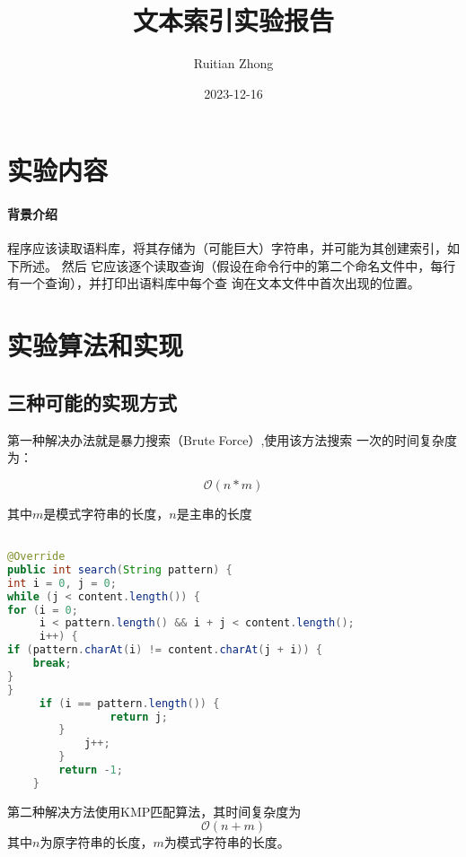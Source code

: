 \documentclass[12pt,a4paper]{ctexart}
\title{文本索引实验报告}
\author{Ruitian Zhong}
\date{2023-12-16}
\begin{document}
\maketitle
\section{实验内容}
\paragraph{背景介绍}

程序应该读取语料库，将其存储为（可能巨大）字符串，并可能为其创建索引，如下所述。 然后
它应该逐个读取查询（假设在命令行中的第二个命名文件中，每行有一个查询），并打印出语料库中每个查
询在文本文件中首次出现的位置。

\section{实验算法和实现}

\subsection{三种可能的实现方式}
第一种解决办法就是暴力搜索（Brute Force）,使用该方法搜索
一次的时间复杂度为：

\begin{equation}
    \nonumber
    \mathcal{O}{(n * m)}
\end{equation}

其中$m$是模式字符串的长度，$n$是主串的长度

\begin{lstlisting}[basicstyle=\ttfamily,caption=text-indexing/BruteForceSearch.java,language=java,showstringspaces=false,firstnumber=105]

@Override
public int search(String pattern) {
int i = 0, j = 0;
while (j < content.length()) {
for (i = 0; 
     i < pattern.length() && i + j < content.length(); 
     i++) {
if (pattern.charAt(i) != content.charAt(j + i)) {
    break;
}
}
     if (i == pattern.length()) {
                return j;
        }
            j++;
        }
        return -1;
    }

\end{lstlisting}

第二种解决方法使用KMP匹配算法，其时间复杂度为
\begin{equation}
    \nonumber
    \mathcal{O}{(n + m)}
\end{equation}
其中$n$为原字符串的长度，$m$为模式字符串的长度。
\end{document}
